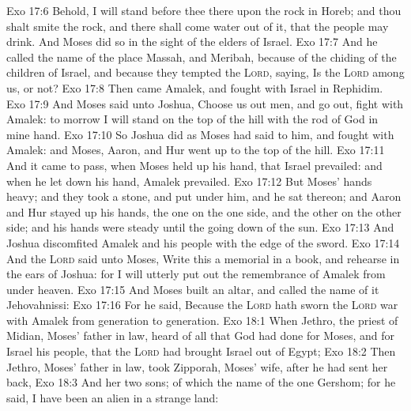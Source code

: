 \vs Exo 17:6 Behold, I will stand before thee there upon the rock in Horeb; and thou shalt smite the rock, and there shall come water out of it, that the people may drink. And Moses did so in the sight of the elders of Israel.
\vs Exo 17:7 And he called the name of the place Massah, and Meribah, because of the chiding of the children of Israel, and because they tempted the \textsc{Lord}, saying, Is the \textsc{Lord} among us, or not?
\vs Exo 17:8 Then came Amalek, and fought with Israel in Rephidim.
\vs Exo 17:9 And Moses said unto Joshua, Choose us out men, and go out, fight with Amalek: to morrow I will stand on the top of the hill with the rod of God in mine hand.
\vs Exo 17:10 So Joshua did as Moses had said to him, and fought with Amalek: and Moses, Aaron, and Hur went up to the top of the hill.
\vs Exo 17:11 And it came to pass, when Moses held up his hand, that Israel prevailed: and when he let down his hand, Amalek prevailed.
\vs Exo 17:12 But Moses' hands  heavy; and they took a stone, and put  under him, and he sat thereon; and Aaron and Hur stayed up his hands, the one on the one side, and the other on the other side; and his hands were steady until the going down of the sun.
\vs Exo 17:13 And Joshua discomfited Amalek and his people with the edge of the sword.
\vs Exo 17:14 And the \textsc{Lord} said unto Moses, Write this  a memorial in a book, and rehearse  in the ears of Joshua: for I will utterly put out the remembrance of Amalek from under heaven.
\vs Exo 17:15 And Moses built an altar, and called the name of it Jehovahnissi:
\vs Exo 17:16 For he said, Because the \textsc{Lord} hath sworn  the \textsc{Lord}  war with Amalek from generation to generation.
\vs Exo 18:1 When Jethro, the priest of Midian, Moses' father in law, heard of all that God had done for Moses, and for Israel his people,  that the \textsc{Lord} had brought Israel out of Egypt;
\vs Exo 18:2 Then Jethro, Moses' father in law, took Zipporah, Moses' wife, after he had sent her back,
\vs Exo 18:3 And her two sons; of which the name of the one  Gershom; for he said, I have been an alien in a strange land:
